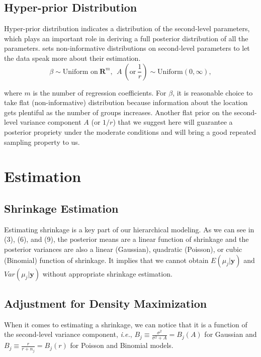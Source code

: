 \documentclass[article]{jss}
\begin{document}
\subsection[Hyper-prior Distribution]{Hyper-prior Distribution}
Hyper-prior distribution indicates a distribution of the second-level parameters, which plays an important role in deriving a full posterior distribution of all the parameters.  sets non-informative distributions on second-level parameters to let the data speak more about their estimation.
\begin{equation}
\beta \sim \textrm{Uniform on}~ \mathbf{R}^{m},~~A ~(\textrm{or}~ \frac{1}{r})\sim \textrm{Uniform}(0, \infty),
\end{equation}

where $m$ is the number of regression coefficients. For $\beta$, it is reasonable choice to take flat (non-informative) distribution because information about the location gets plentiful as the number of groups increases. Another flat prior on the second-level variance component  $A$ (or $1/r$) that we suggest here will guarantee a posterior propriety under the moderate conditions and will bring a good repeated sampling property to us.
\\



\section[Estimation]{Estimation}

\subsection[Shrinkage Estimation]{Shrinkage Estimation}
Estimating shrinkage is a key part of our hierarchical modeling. As we can see in (3), (6), and (9), the posterior means are a linear function of shrinkage and the posterior variances are also a linear (Gaussian), quadratic (Poisson), or cubic (Binomial) function of shrinkage. It implies that we cannot obtain $E(\mu_{j}\vert \textbf{y})$ and $Var(\mu_{j}\vert \textbf{y})$ without appropriate shrinkage estimation.

\subsection[ADM]{Adjustment for Density Maximization}
When it comes to estimating a shrinkage, we can notice that it is a function of the second-level variance component, \emph{i.e.}, $B_{j}\equiv\frac{\sigma^{2}}{\sigma^{2}+A}=B_{j}(A)$ for Gaussian and $B_{j}\equiv\frac{r}{r+n_{j}}=B_{j}(r)$ for Poisson and Binomial models.
\\
\end{document}
